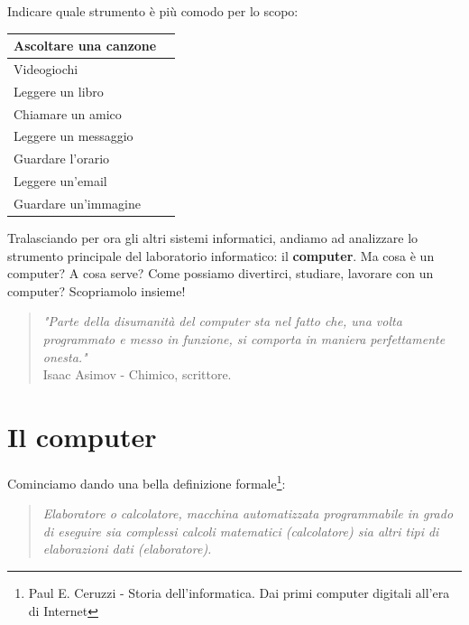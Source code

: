 \documentclass[12pt,fleqn,a4paper]{book} %
\begin{document}
				\begin{exercise} Indicare quale strumento è più comodo per lo scopo:\\
					\begin{tabular}{|>{\raggedright\arraybackslash}p{5cm}|p{8cm}|}
						\hline 
						\rule[-1ex]{0pt}{5ex} Ascoltare una canzone &  \\ 
						\hline 
						\rule[-1ex]{0pt}{5ex} Videogiochi &  \\ 
						\hline 
						\rule[-1ex]{0pt}{5ex} Leggere un libro &  \\ 
						\hline 
						\rule[-1ex]{0pt}{5ex} Chiamare un amico &  \\ 
						\hline 
						\rule[-1ex]{0pt}{5ex} Leggere un messaggio &  \\ 
						\hline 
						\rule[-1ex]{0pt}{5ex} Guardare l'orario &  \\ 
						\hline 
						\rule[-1ex]{0pt}{5ex} Leggere un'email &  \\ 
						\hline 
						\rule[-1ex]{0pt}{5ex} Guardare un'immagine &  \\ 
						\hline 
					\end{tabular} 	
				\end{exercise}
    			
    			Tralasciando per ora gli altri sistemi informatici, andiamo ad analizzare lo strumento principale del laboratorio informatico: il \textbf{computer}. Ma cosa è un computer? A cosa serve? Come possiamo divertirci, studiare, lavorare con un computer?
    			Scopriamolo insieme!
    			\begin{quote}
    				\textit{"Parte della disumanità del computer sta nel fatto che, una volta programmato e messo in funzione, si comporta in maniera perfettamente onesta."}\\
    				Isaac Asimov - Chimico, scrittore.
    			\end{quote}
    		
    	\chapter{Il computer}
    	\label{cap: Il computer}
    		Cominciamo dando una bella definizione formale\footnote{Paul E. Ceruzzi - Storia dell'informatica. Dai primi computer digitali all'era di Internet}:
    		\begin{quote}
				\textit{Elaboratore o calcolatore, macchina automatizzata programmabile in grado di eseguire sia complessi calcoli matematici (calcolatore) sia altri tipi di elaborazioni dati (elaboratore).}
    		\end{quote}
    	
\end{document}
